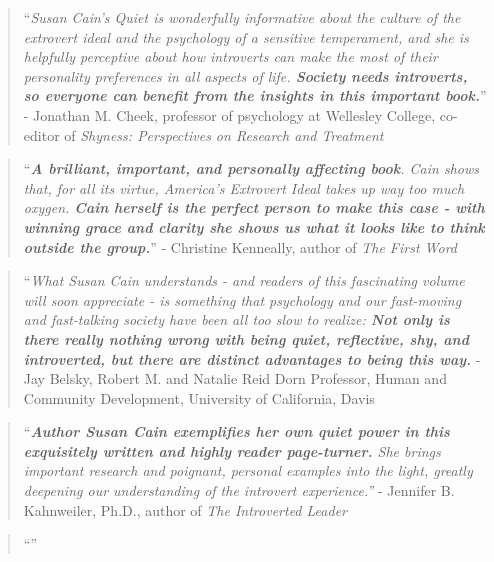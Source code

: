 \documentclass{book}
\numberwithin{equation}{section}
\begin{document}
\begin{quotation}
    ``\textit{Susan Cain's \emph{Quiet} is wonderfully informative about the culture of the extrovert ideal and the psychology of a sensitive temperament, and she is helpfully perceptive about how introverts can make the most of their personality preferences in all aspects of life. \textbf{Society needs introverts, so everyone can benefit from the insights in this important book.}}'' - Jonathan M. Cheek, professor of psychology at Wellesley College, co-editor of \textit{Shyness: Perspectives on Research and Treatment}
\end{quotation}

\begin{quotation}
    ``\textit{\textbf{A brilliant, important, and personally affecting book}. Cain shows that, for all its virtue, America's Extrovert Ideal takes up way too much oxygen. \textbf{Cain herself is the perfect person to make this case - with winning grace and clarity she shows us what it looks like to think outside the group.}}'' - Christine Kenneally, author of \textit{The First Word}
\end{quotation}

\begin{quotation}
    ``\textit{What Susan Cain understands - and readers of this fascinating volume will soon appreciate - is something that psychology and our fast-moving and fast-talking society have been all too slow to realize: \textbf{Not only is there really nothing wrong with being quiet, reflective, shy, and introverted, but there are distinct advantages to being this way.}} - Jay Belsky, Robert M. and Natalie Reid Dorn Professor, Human and Community Development, University of California, Davis
\end{quotation}

\begin{quotation}
    ``\textit{\textbf{Author Susan Cain exemplifies her own quiet power in this exquisitely written and highly reader page-turner.} She brings important research and poignant, personal examples into the light, greatly deepening our understanding of the introvert experience.''} - Jennifer B. Kahnweiler, Ph.D., author of \textit{The Introverted Leader}
\end{quotation}


\begin{quotation}
    ``\textit{}''
\end{quotation}

\part{}

\chapter{}

\section{}



\printbibliography[heading=bibintoc]
\end{document}

